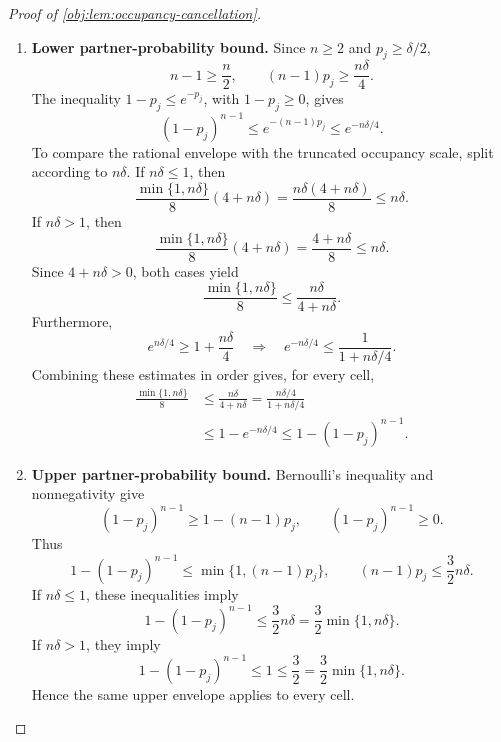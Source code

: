 \begin{proof}[Proof of \cref{obj:lem:occupancy-cancellation}]
\begin{enumerate}
The probability law \(\mathsf G_j\otimes\mathsf G_j\) is supported on
\(C_j\times C_j\). Therefore,
\[
\begin{aligned}
|\nu_j-\theta(P)d_j|
&=
\left|\int
 \bigl(\mathcal K_{N,P}-\theta(P)\mathcal K_{D,P}\bigr)
 \,d(\mathsf G_j\otimes\mathsf G_j)\right|\\
&\le
\int
 \left|\mathcal K_{N,P}-\theta(P)\mathcal K_{D,P}\right|
 \,d(\mathsf G_j\otimes\mathsf G_j)\\
&\le
b\int\mathcal K_{D,P}\,d(\mathsf G_j\otimes\mathsf G_j)
=bd_j.
\end{aligned}
\]

\item \textbf{Lower partner-probability bound.}
Since \(n\ge2\) and \(p_j\ge\delta/2\),
\[
n-1\ge\frac n2,
\qquad
(n-1)p_j\ge\frac{n\delta}{4}.
\]
The inequality \(1-p_j\le e^{-p_j}\), with \(1-p_j\ge0\), gives
\[
(1-p_j)^{n-1}
\le e^{-(n-1)p_j}
\le e^{-n\delta/4}.
\]
To compare the rational envelope with the truncated occupancy scale, split according to \(n\delta\). If \(n\delta\le1\), then
\[
\frac{\min\{1,n\delta\}}8(4+n\delta)
=\frac{n\delta(4+n\delta)}8
\le n\delta.
\]
If \(n\delta>1\), then
\[
\frac{\min\{1,n\delta\}}8(4+n\delta)
=\frac{4+n\delta}{8}
\le n\delta.
\]
Since \(4+n\delta>0\), both cases yield
\[
\frac{\min\{1,n\delta\}}8
\le\frac{n\delta}{4+n\delta}.
\]
Furthermore,
\[
e^{n\delta/4}\ge1+\frac{n\delta}{4}
\quad\Longrightarrow\quad
e^{-n\delta/4}\le
\frac{1}{1+n\delta/4}.
\]
Combining these estimates in order gives, for every cell,
\[
\begin{aligned}
\frac{\min\{1,n\delta\}}8
&\le\frac{n\delta}{4+n\delta}
=\frac{n\delta/4}{1+n\delta/4}\\
&\le1-e^{-n\delta/4}
\le1-(1-p_j)^{n-1}.
\end{aligned}
\]

\item \textbf{Upper partner-probability bound.}
Bernoulli's inequality and nonnegativity give
\[
(1-p_j)^{n-1}\ge1-(n-1)p_j,
\qquad
(1-p_j)^{n-1}\ge0.
\]
Thus
\[
1-(1-p_j)^{n-1}
\le\min\{1,(n-1)p_j\},
\qquad
(n-1)p_j\le\frac32n\delta.
\]
If \(n\delta\le1\), these inequalities imply
\[
1-(1-p_j)^{n-1}
\le\frac32n\delta
=\frac32\min\{1,n\delta\}.
\]
If \(n\delta>1\), they imply
\[
1-(1-p_j)^{n-1}
\le1\le\frac32
=\frac32\min\{1,n\delta\}.
\]
Hence the same upper envelope applies to every cell.


\end{enumerate}
\end{proof}
